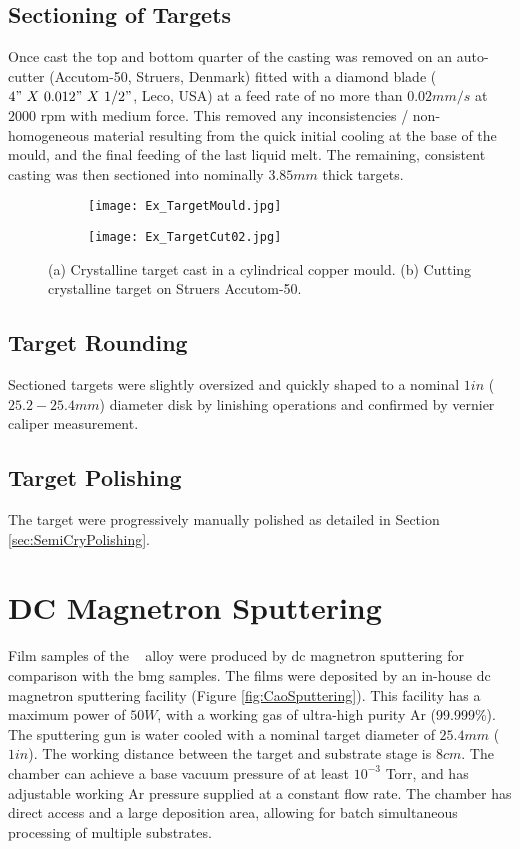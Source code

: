 \subsection{Sectioning of Targets}
Once cast the top and bottom quarter of the casting was removed on an auto-cutter (Accutom-50, Struers, Denmark) fitted with a diamond blade ($4"~ X~ 0.012"~ X~ 1/2"$, Leco, USA) at a feed rate of no more than $0.02 mm/s$ at $2000$ \acrshort{rpm} with medium force. This removed any inconsistencies / non-homogeneous material resulting from the quick initial cooling at the base of the mould, and the final feeding of the last liquid melt. The remaining, consistent casting was then sectioned into nominally $3.85 mm$ thick targets.

\begin{figure}[htbp]
	\begin{subfigure}[htbp]{0.463\textwidth}
		\texttt{[image: Ex\_TargetMould.jpg]}
		\caption{}
		\label{fig:Xtal_Casting_Target}
	\end{subfigure}
	\begin{subfigure}[htbp]{0.45\textwidth}
		\texttt{[image: Ex\_TargetCut02.jpg]}
		\caption{}
		\label{fig:Xtal_Cutting_Target}
	\end{subfigure}
	\caption{(a) Crystalline target cast in a cylindrical copper mould. (b) Cutting crystalline target on Struers Accutom-50.}%
	\label{fig:Xtal_Target}
\end{figure}

\subsection{Target Rounding}
Sectioned targets were slightly oversized and quickly shaped to a nominal $1 in$ ($25.2 - 25.4 mm$) diameter disk by linishing operations and confirmed by vernier caliper measurement.

\subsection{Target Polishing}
The target were progressively manually polished as detailed in Section \ref{sec:SemiCryPolishing}.

\section{DC Magnetron Sputtering}
Film samples of the \MgZnCa~ alloy were produced by \gls{dc} magnetron sputtering for comparison with the \gls{bmg} samples. The films were deposited by an in-house \acrshort{dc} magnetron sputtering facility (Figure \ref{fig:CaoSputtering}). This facility has a maximum power of $50 W$, with a working gas of ultra-high purity Ar (99.999\%). The sputtering gun is water cooled with a nominal target diameter of $25.4 mm$ ($1 in$). The working distance between the target and substrate stage is $8 cm$. The chamber can achieve a base vacuum pressure of at least $10^{-3}$ Torr, and has adjustable working Ar pressure supplied at a constant flow rate. The chamber has direct access and a large deposition area, allowing for batch simultaneous processing of multiple substrates.

